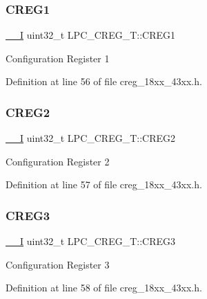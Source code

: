 \subsubsection{\texorpdfstring{C\+R\+E\+G1}{CREG1}}
{\footnotesize\ttfamily \hyperlink{core__sc300_8h_af63697ed9952cc71e1225efe205f6cd3}{\+\_\+\+\_\+I} uint32\+\_\+t L\+P\+C\+\_\+\+C\+R\+E\+G\+\_\+\+T\+::\+C\+R\+E\+G1}

Configuration Register 1 

Definition at line 56 of file creg\+\_\+18xx\+\_\+43xx.\+h.

\mbox{\label{struct_l_p_c___c_r_e_g___t_a9db0556ccf5c70a237de4f0d04386f74}} 
\subsubsection{\texorpdfstring{C\+R\+E\+G2}{CREG2}}
{\footnotesize\ttfamily \hyperlink{core__sc300_8h_af63697ed9952cc71e1225efe205f6cd3}{\+\_\+\+\_\+I} uint32\+\_\+t L\+P\+C\+\_\+\+C\+R\+E\+G\+\_\+\+T\+::\+C\+R\+E\+G2}

Configuration Register 2 

Definition at line 57 of file creg\+\_\+18xx\+\_\+43xx.\+h.

\mbox{\label{struct_l_p_c___c_r_e_g___t_af0e0450b1c2575c82107b0a578c26895}} 
\subsubsection{\texorpdfstring{C\+R\+E\+G3}{CREG3}}
{\footnotesize\ttfamily \hyperlink{core__sc300_8h_af63697ed9952cc71e1225efe205f6cd3}{\+\_\+\+\_\+I} uint32\+\_\+t L\+P\+C\+\_\+\+C\+R\+E\+G\+\_\+\+T\+::\+C\+R\+E\+G3}

Configuration Register 3 

Definition at line 58 of file creg\+\_\+18xx\+\_\+43xx.\+h.

\mbox{\label{struct_l_p_c___c_r_e_g___t_a035648fad8e147e9b0f90462aaacac95}} 
